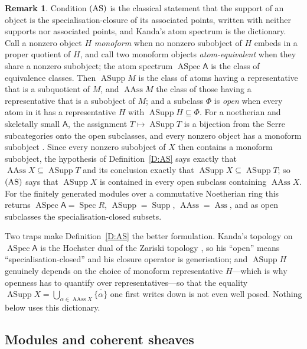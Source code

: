 \documentclass[reqno,a4paper]{amsart}
\numberwithin{equation}{section}
\theoremstyle{plain}
\theoremstyle{definition}
\newtheorem{remark}[subsection]{Remark}
\def\nameit#1{\textrm{#1}~}
\def\defx{\nameit{Definition}}
\newcommand{\ov}[1]{\overline{#1}}
\newcommand{\onecat}[1]{\ensuremath{\mathsf{#1}}\xspace}
\renewcommand{\1}{\onecat{1}}
\DeclareMathOperator{\Spec}{Spec}
\DeclareMathOperator{\Supp}{Supp}
\DeclareMathOperator{\Ass}{Ass}
\DeclareMathOperator{\ASpec}{ASpec}
\DeclareMathOperator{\ASupp}{ASupp}
\DeclareMathOperator{\AAss}{AAss}
\newcommand{\AS}{\textup{(AS)}}
\begin{document}
\begin{remark}\label{R:Atoms}
	Condition \(\AS\) is the classical statement that the support of an object is the specialisation-closure of its associated points, written with neither supports nor associated points, and Kanda's atom spectrum \cite[Definitions~2.1, 3.1, 3.4 and~3.7]{Kanda12} is the dictionary. Call a nonzero object \(H\) \emph{monoform} when no nonzero subobject of \(H\) embeds in a proper quotient of \(H\), and call two monoform objects \emph{atom-equivalent} when they share a nonzero subobject; the atom spectrum \(\ASpec\onecat{A}\) is the class of equivalence classes. Then \(\ASupp M\) is the class of atoms having a representative that is a subquotient of \(M\), and \(\AAss M\) the class of those having a representative that is a subobject of \(M\); and a subclass \(\Phi\) is \emph{open} when every atom in it has a representative \(H\) with \(\ASupp H\subseteq\Phi\). For a noetherian and skeletally small \(\onecat{A}\), the assignment \(T\mapsto\ASupp T\) is a bijection from the Serre subcategories onto the open subclasses, and every nonzero object has a monoform subobject \cite[Theorems~4.3 and~2.9]{Kanda12}. Since every nonzero subobject of \(X\) then contains a monoform subobject, the hypothesis of \defx\ref{D:AS} says exactly that \(\AAss X\subseteq\ASupp T\) and its conclusion exactly that \(\ASupp X\subseteq\ASupp T\); so \(\AS\) says that \(\ASupp X\) is contained in every open subclass containing \(\AAss X\). For the finitely generated modules over a commutative Noetherian ring this returns \(\ASpec\onecat{A}=\Spec R\), \(\ASupp=\Supp\), \(\AAss=\Ass\), and as open subclasses the specialisation-closed subsets.

	Two traps make \defx\ref{D:AS} the better formulation. Kanda's topology on \(\ASpec\onecat{A}\) is the Hochster dual of the Zariski topology \cite[Remark~7.4]{Kanda12}, so his ``open'' means ``specialisation-closed'' and his closure operator is generisation; and \(\ASupp H\) genuinely depends on the choice of monoform representative \(H\)---which is why openness has to quantify over representatives---so that the equality \(\ASupp X=\bigcup_{\alpha\in\AAss X}\ov{\{\alpha\}}\) one first writes down is not even well posed. Nothing below uses this dictionary.
\end{remark}

\subsection{Modules and coherent sheaves}\label{SS:ModelExamples}
\end{document}
